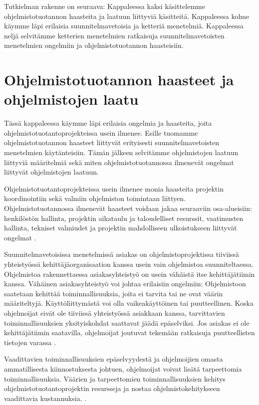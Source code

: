 \documentclass[finnish]{tktltiki2}
\theoremstyle{definition}
\theoremstyle{remark}
\begin{document}
Tutkielman rakenne on seuraava: Kappaleessa kaksi käsittelemme ohjelmistotuotannon haasteita ja laatuun liittyviä käsitteitä. Kappaleessa kolme käymme läpi erilaisia suunnitelmavetoisia ja ketteriä menetelmiä. Kappaleessa neljä selvitämme ketterien menetelmien ratkaisuja suunnitelmavetoisten menetel\-mien ongelmiin ja ohjelmistotuotannon haasteisiin. 

\section{Ohjelmistotuotannon haasteet ja ohjelmistojen laatu}

Tässä kappaleessa käymme läpi erilaisia ongelmia ja haasteita, joita ohjelmistotuotantoprojekteissa usein ilmenee. Esille tuomamme ohjelmistotuotannon haasteet liittyvät erityisesti suunnitelmavetoisten menetelmien käytänteisiin. Tämän jälkeen selvitämme ohjelmistojen laatuun liittyviä määritelmiä sekä miten ohjelmistotuotannossa ilmenevät ongelmat liittyvät ohjelmistojen laatuun.

Ohjelmistotuotantoprojekteissa usein ilmenee monia haasteita projektin koordinointiin sekä valmiin ohjelmiston toimintaan liittyen. Ohjelmistotuotannossa ilmenevät haasteet voidaan jakaa seuraaviin osa-alueisiin: henkilöstön hallinta, projektin aikataulu ja taloudelliset resurssit, vaatimusten hallinta, tekniset valmiudet ja projektin mahdolliseen ulkoistukseen liittyvät ongelmat \cite{BOE88}.

Suunnitelmavetoisissa menetelmissä asiakas on ohjelmistoprojektissa tiiviissä yhteistyössä kehittäjäorganisaation kanssa usein vain ohjelmistoa suunniteltaessa. Ohjelmistoa rakennettaessa asiakasyhteistyö on usein vähäistä itse kehittäjätiimin kanssa. Vähäinen asiakasyhteistyö voi johtaa erilaisiin ongelmiin: Ohjelmistoon saatetaan kehittää toiminnallisuuksia, joita ei tarvita tai ne ovat väärin määriteltyjä. Käyttöliittymästä voi olla vaikeakäyttöinen tai puutteellinen. Koska ohjelmoijat eivät ole tiiviissä yhteistyössä asiakkaan kanssa, tarvittavien toiminnallisuuksien yksityiskohdat saattavat jäädä epäselviksi. Jos asiakas ei ole kehittäjätiimin saatavilla, ohjelmoijat joutuvat tekemään ratkaisuja puutteellisten tietojen varassa  \cite{BOE88}.

Vaadittavien toiminnallisuuksien epäselvyydestä ja ohjelmoijien omasta ammatillisesta kiinnostuksesta johtuen, ohjelmoijat voivat lisätä tarpeettomia toiminnallisuuksia. Väärien ja tarpeettomien toiminnallisuuksien kehitys ohjelmistotuotantoprojektin resursseja ja nostaa ohjelmistokehitykseen vaadittavia kustannuksia. \cite{BOE88}.
\end{document}
